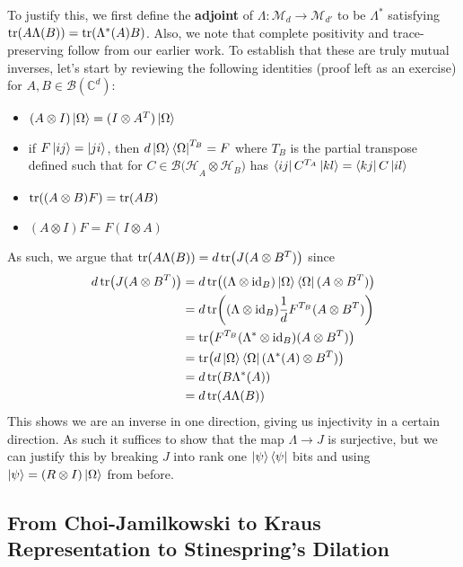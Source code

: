 \documentclass{article}
\theoremstyle{definition}
\newcommand{\id}{\text{id}}
\begin{document}
To justify this, we first define the \textbf{adjoint} of $\Lambda : \mathcal{M}_d
\to \mathcal{M}_{d'}$ to be $\mathcal{\Lambda}^*$ satisfying $\tr(A \Lambda(B)) =
\tr(\Lambda^*(A)B)$. Also, we note that complete positivity and trace-preserving 
follow from our earlier work. To establish that these are truly mutual inverses, 
let's start by reviewing the following identities (proof left as an exercise) 
for $A, B \in \mathcal{B}(\mathbb{C}^d)$:
\begin{itemize}
  \item $(A \otimes I) \ket\Omega = (I \otimes A^T) \ket\Omega$
  \item if $F\ket{ij} = \ket{ji}$, then $d\ket\Omega \bra\Omega^{T_B} = F$ where
    $T_B$ is the partial transpose defined such that for $C \in \mathcal{B(H}_A
    \otimes \mathcal{H}_B)$ has $\bra{ij} C^{T_A} \ket{kl} = \bra{kj} C \ket{il}$
  \item $\tr((A \otimes B)F) = \tr(AB)$
  \item $(A \otimes I)F = F(I \otimes A)$
\end{itemize}
As such, we argue that $\tr(A \Lambda(B)) = d\tr(J(A \otimes B^T))$ since 
\begin{align*}
  d\tr(J(A \otimes B^T))
  &= d \tr ((\Lambda \otimes \id_B) \ket\Omega \bra\Omega(A \otimes B^T)) \\
  &= d\tr((\Lambda \otimes \id_B) \frac{1}{d} F^{T_B} (A \otimes B^T)) \\
  &= \tr(F^{T_B} (\Lambda^* \otimes \id_B)(A \otimes B^T)) \\
  &= \tr(d \ket\Omega \bra\Omega (\Lambda^*(A) \otimes B^T)) \\
  &= d\tr(B\Lambda^*(A)) \\
  &= d\tr(A \Lambda(B))
\end{align*}
This shows we are an inverse in one direction, giving us injectivity in a certain
direction. As such it suffices to show that the map $\Lambda \to J$ is surjective,
but we can justify this by breaking $J$ into rank one $\ket\psi \bra\psi$ bits and
using $\ket\psi = (R \otimes I) \ket\Omega$ from before.

\subsection{From Choi-Jamilkowski to Kraus Representation to Stinespring's 
Dilation}
\end{document}
